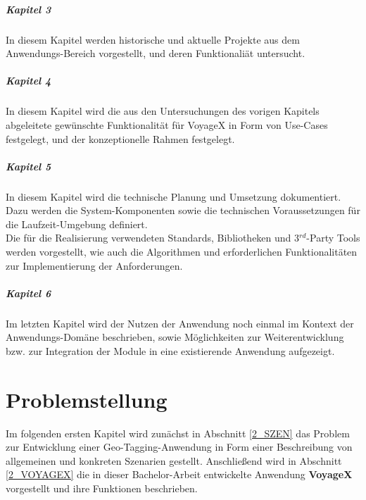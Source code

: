 \subparagraph{Kapitel 3}
In diesem Kapitel werden historische und aktuelle Projekte aus dem Anwendungs-Bereich vorgestellt, und
deren Funktionaliät untersucht.

\subparagraph{Kapitel 4}
In diesem Kapitel wird die aus den Untersuchungen des vorigen Kapitels abgeleitete gewünschte Funktionalität für VoyageX in Form von Use-Cases festgelegt, und der konzeptionelle Rahmen festgelegt.

\subparagraph{Kapitel 5}
In diesem Kapitel wird die technische Planung und Umsetzung dokumentiert. Dazu werden die System-Komponenten  sowie die technischen Voraussetzungen für die Laufzeit-Umgebung definiert.\\
Die für die Realisierung verwendeten Standards, Bibliotheken und 3$^{rd}$-Party Tools werden vorgestellt, wie auch die Algorithmen und erforderlichen Funktionalitäten zur Implementierung der Anforderungen.

\subparagraph{Kapitel 6}
Im letzten Kapitel wird der Nutzen der Anwendung noch einmal im Kontext der Anwendungs-Domäne beschrieben, sowie Möglichkeiten zur Weiterentwicklung bzw. zur Integration der Module in eine existierende Anwendung aufgezeigt.



\newpage
%
%
\section{Problemstellung}
Im folgenden ersten Kapitel wird zunächst in Abschnitt \ref{2_SZEN} das Problem zur Entwicklung einer Geo-Tagging-Anwendung in Form einer Beschreibung von allgemeinen und konkreten Szenarien gestellt. Anschließend wird in Abschnitt \ref{2_VOYAGEX} die in dieser Bachelor-Arbeit entwickelte Anwendung \textbf{VoyageX} vorgestellt und ihre Funktionen beschrieben.


